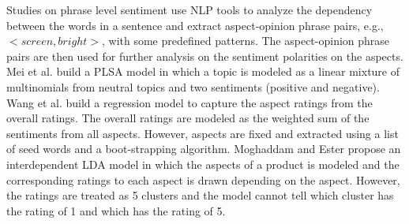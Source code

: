 Studies on phrase level sentiment
\cite{MeiTSM:2007,WangLRR:2010, Lu:2011:ACC,MoghaddamILDA:2011,Zhang:2014:URR}
use NLP tools to
analyze the dependency between the words in a sentence
and extract aspect-opinion phrase pairs, e.g., $<screen, bright>$,
with some predefined patterns.
The aspect-opinion phrase pairs are then used for
further analysis on the sentiment polarities on the aspects.
Mei et al. \cite{MeiTSM:2007} build a PLSA
model in which a topic is modeled as a linear mixture
of multinomials from neutral topics and two sentiments (positive
and negative). 
Wang et al. \cite{WangLRR:2010} build a regression model to capture the aspect
ratings from the overall ratings. 
The overall ratings are
modeled as the weighted sum of the sentiments from all aspects. However, aspects
are fixed and extracted using a list of seed words and a boot-strapping
algorithm.
Moghaddam and Ester
\cite{MoghaddamILDA:2011} propose an interdependent LDA model in
which the aspects of a product is modeled and the corresponding ratings
to each aspect is drawn depending on the aspect. However, the ratings
are treated as 5 clusters and the model cannot tell which cluster
has the rating of 1 and which has the rating of 5.



